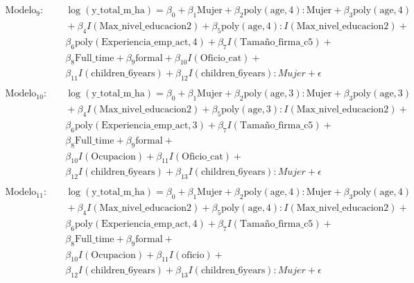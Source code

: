 \documentclass[12pt,a4paper,onecolumn]{article}
\begin{document}
\begin{align*}
\\
\text{Modelo}_9: & \quad \log(\text{y\_total\_m\_ha}) = \beta_0 + \beta_1 \text{Mujer} + \beta_2 \text{poly}(\text{age}, 4) : \text{Mujer} + \beta_3 \text{poly}(\text{age}, 4) \\
& \quad + \beta_4 I(\text{Max\_nivel\_educacion2}) + \beta_5 \text{poly}(\text{age}, 4) : I(\text{Max\_nivel\_educacion2}) +  \\
& \quad \beta_6 \text{poly}(\text{Experiencia\_emp\_act}, 4) + \beta_7 I(\text{Tamaño\_firma\_c5}) +  \\
& \quad \beta_8 \text{Full\_time} + \beta_9 \text{formal} + \beta_{10} I(\text{Oficio\_cat}) + \\
& \quad \beta_{11} I(\text{children\_6years}) + \beta_{12} I(\text{children\_6years}):Mujer + \epsilon \\
\\
\text{Modelo}_{10}: & \quad \log(\text{y\_total\_m\_ha}) = \beta_0 + \beta_1 \text{Mujer} + \beta_2 \text{poly}(\text{age}, 3) : \text{Mujer} + \beta_3 \text{poly}(\text{age}, 3) \\
& \quad + \beta_4 I(\text{Max\_nivel\_educacion2}) + \beta_5 \text{poly}(\text{age}, 3) : I(\text{Max\_nivel\_educacion2}) + \\
& \quad \beta_6 \text{poly}(\text{Experiencia\_emp\_act}, 3) + \beta_7 I(\text{Tamaño\_firma\_c5}) +  \\
& \quad \beta_8 \text{Full\_time} + \beta_9 \text{formal} +  \\
& \quad \beta_{10} I(\text{Ocupacion}) + \beta_{11} I(\text{Oficio\_cat}) + \\ & \quad \beta_{12} I(\text{children\_6years}) + \beta_{13} I(\text{children\_6years}):Mujer + \epsilon \\
\\
\text{Modelo}_{11}: & \quad \log(\text{y\_total\_m\_ha}) = \beta_0 + \beta_1 \text{Mujer} + \beta_2 \text{poly}(\text{age}, 4) : \text{Mujer} + \beta_3 \text{poly}(\text{age}, 4) \\
& \quad + \beta_4 I(\text{Max\_nivel\_educacion2}) + \beta_5 \text{poly}(\text{age}, 4) : I(\text{Max\_nivel\_educacion2}) +  \\
& \quad \beta_6 \text{poly}(\text{Experiencia\_emp\_act}, 4) + \beta_7 I(\text{Tamaño\_firma\_c5}) +  \\
& \quad \beta_8 \text{Full\_time} + \beta_9 \text{formal} +  \\
& \quad \beta_{10} I(\text{Ocupacion}) + \beta_{11} I(\text{oficio}) + \\ & \quad \beta_{12} I(\text{children\_6years}) + \beta_{13} I(\text{children\_6years}):Mujer + \epsilon \\

\end{align*}
\end{document}
